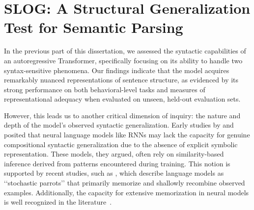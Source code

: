 \chapter{SLOG: A Structural Generalization Test for Semantic Parsing} \label{chp:slog}


\startcontents[chapters]
\printmyminitoc{
}


\noindent In the previous part of this dissertation, we assessed the syntactic capabilities of an autoregressive Transformer, specifically focusing on its ability to handle two syntax-sensitive phenomena. Our findings indicate that the model acquires remarkably nuanced representations of sentence structure, as evidenced by its strong performance on both behavioral-level tasks and measures of representational adequacy when evaluated on unseen, held-out evaluation sets.  


However, this leads us to another critical dimension of inquiry: the nature and depth of the model's observed syntactic generalization. Early studies by \cite{fodor2002compositionality} and \cite{marcus2003algebraic}
posited that neural language models like RNNs may lack the capacity for genuine compositional syntactic generalization due to the absence of explicit symbolic representation. These models, they argued, often rely on similarity-based inference derived from patterns encountered during training. This notion is supported by recent studies, such as \cite{bender2021dangers}, which describe language models as ‘‘stochastic parrots’’ that primarily memorize and shallowly recombine observed examples. Additionally, the capacity for extensive memorization in neural models is well recognized in the literature~\citep{halevy2009unreasonable,zhang2021understanding}.

